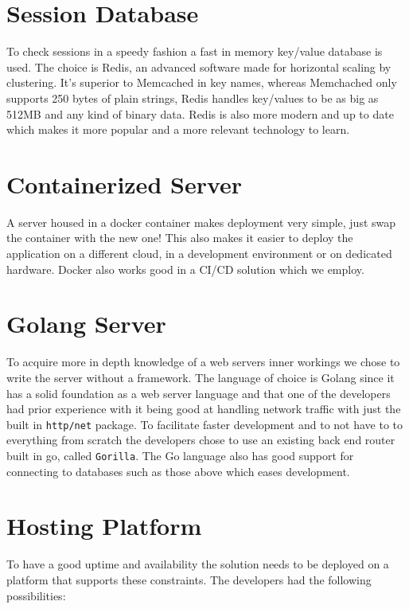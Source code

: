 \documentclass[12pt,a4paper]{report}
\begin{document}
\section{Session Database}
To check sessions in a speedy fashion a fast in memory key/value database is used. The choice is Redis, an advanced software made for horizontal scaling by clustering. It's superior to Memcached in key names, whereas Memchached only supports 250 bytes of plain strings, Redis handles key/values to be as big as 512MB and any kind of binary data. Redis is also more modern and up to date which makes it more popular and a more relevant technology to learn.

\section{Containerized Server}
A server housed in a docker container makes deployment very simple, just swap the container with the new one! This also makes it easier to deploy the application on a different cloud, in a development environment or on dedicated hardware. Docker also works good in a CI/CD solution which we employ.

\section{Golang Server}
To acquire more in depth knowledge of a web servers inner workings we chose to write the server without a framework. The language of choice is Golang since it has a solid foundation as a web server language and that one of the developers had prior experience with it being good at handling network traffic with just the built in \texttt{http/net} package. To facilitate faster development and to not have to to everything from scratch the developers chose to use an existing back end router built in go, called \texttt{Gorilla}.
The Go language also has good support for connecting to databases such as those above which eases development. 

\section{Hosting Platform}
To have a good uptime and availability the solution needs to be deployed on a platform that supports these constraints. The developers had the following possibilities:
\end{document}
